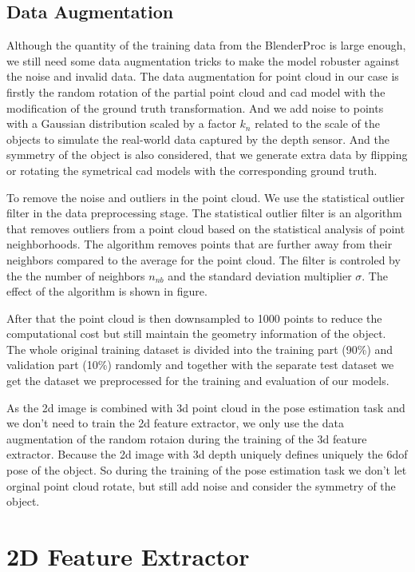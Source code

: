 \documentclass[12pt,DIV14,BCOR12mm,a4paper,footinclude=false,headinclude,parskip=half-,twoside,openright,cleardoublepage=empty,toc=index,bibliography=totoc,listof=totoc]{scrreprt}
\numberwithin{equation}{chapter}
\begin{document}
\subsection{Data Augmentation}
Although the quantity of the training data from the BlenderProc is large enough, we still need some data augmentation tricks to make the model robuster against the noise and invalid data. The data augmentation for point cloud in our case is firstly the random rotation of the partial point cloud and \gls{cad} model with the modification of the ground truth transformation. And we add noise to points with a Gaussian distribution scaled by a factor $k_{n}$ related to the scale of the objects to simulate the real-world data captured by the depth sensor. And the symmetry of the object is also considered, that we generate extra data by flipping or rotating the symetrical \gls{cad} models with the corresponding ground truth. 

To remove the noise and outliers in the point cloud. We use the statistical outlier filter in the data preprocessing stage. The statistical outlier filter is an algorithm that removes outliers from a point cloud based on the statistical analysis of point neighborhoods. The algorithm removes points that are further away from their neighbors compared to the average for the point cloud. The filter is controled by the the number of neighbors $n_{nb}$ and the standard deviation multiplier $\sigma$. The effect of the algorithm is shown in figure.

After that the point cloud is then downsampled to 1000 points to reduce the computational cost but still maintain the geometry information of the object. The whole original training dataset is divided into the training part (90\%) and validation part (10\%) randomly and together with the separate test dataset we get the dataset we preprocessed for the training and evaluation of our models.

As the \gls{2d} image is combined with \gls{3d} point cloud in the pose estimation task and we don't need to train the \gls{2d} feature extractor, we only use the data augmentation of the random rotaion during the training of the \gls{3d} feature extractor. Because the \gls{2d} image with \gls{3d} depth uniquely defines uniquely the \gls{6dof} pose of the object. So during the training of the pose estimation task we don't let orginal point cloud rotate, but still add noise and consider the symmetry of the object.
\section{2D Feature Extractor}
\end{document}
